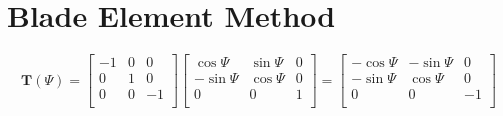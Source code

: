 \chapter{Blade Element Method}

\begin{equation}
  \boldsymbol T \left( \Psi \right)
  =
  \left[
    \begin{matrix}
      -1 & 0 &  0 \\
       0 & 1 &  0 \\
       0 & 0 & -1 \\
    \end{matrix}
  \right]
  \left[
    \begin{matrix}
       \cos \Psi & \sin \Psi & 0 \\
      -\sin \Psi & \cos \Psi & 0 \\
               0 &         0 & 1 \\
    \end{matrix}
  \right]
  =
  \left[
    \begin{matrix}
      -\cos \Psi & -\sin \Psi &  0 \\
      -\sin \Psi &  \cos \Psi &  0 \\
               0 &          0 & -1 \\
    \end{matrix}
  \right]
\end{equation}
